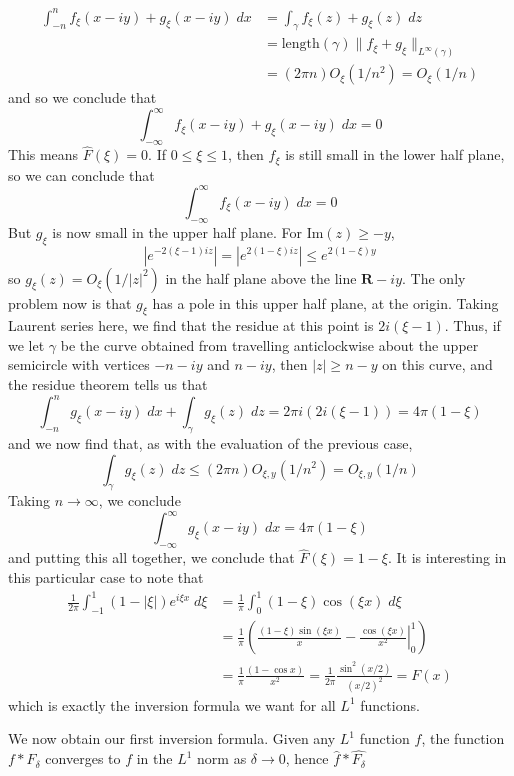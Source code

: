 \begin{example}
	\begin{align*}
		\int_{-n}^n f_\xi(x - iy) + g_\xi(x - iy)\; dx &= \int_\gamma f_\xi(z) + g_\xi(z)\; dz\\
		&= \text{length}(\gamma) \| f_\xi + g_\xi \|_{L^\infty(\gamma)}\\
		&= (2 \pi n) O_\xi(1/n^2) = O_\xi(1/n)
	\end{align*}
	and so we conclude that
	\[ \int_{-\infty}^\infty f_\xi(x - iy) + g_\xi(x - iy)\; dx = 0 \]
	This means $\widehat{F}(\xi) = 0$. If $0 \leq \xi \leq 1$, then $f_\xi$ is still small in the lower half plane, so we can conclude that
	\[ \int_{-\infty}^\infty f_\xi(x - iy)\; dx = 0 \]
	But $g_\xi$ is now small in the upper half plane. For $\text{Im}(z) \geq -y$,
	\[ |e^{-2(\xi - 1)iz}| = |e^{2(1 - \xi)iz}| \leq e^{2(1 - \xi)y} \] 
	so $g_\xi(z) = O_\xi(1/|z|^2)$ in the half plane above the line $\mathbf{R} - iy$. The only problem now is that $g_\xi$ has a pole in this upper half plane, at the origin. Taking Laurent series here, we find that the residue at this point is $2i(\xi - 1)$. Thus, if we let $\gamma$ be the curve obtained from travelling anticlockwise about the upper semicircle with vertices $-n - iy$ and $n - iy$, then $|z| \geq n - y$ on this curve, and the residue theorem tells us that
	\[ \int_{-n}^n g_\xi(x - iy)\; dx + \int_\gamma g_\xi(z)\; dz = 2\pi i (2i(\xi - 1)) = 4 \pi (1 - \xi) \]
	and we now find that, as with the evaluation of the previous case,
	\[ \int_\gamma g_\xi(z)\; dz \leq (2 \pi n) O_{\xi,y}(1/n^2) = O_{\xi,y}(1/n) \]
	Taking $n \to \infty$, we conclude
	\[ \int_{-\infty}^\infty g_\xi(x - iy)\; dx = 4 \pi (1 - \xi) \]
	and putting this all together, we conclude that $\widehat{F}(\xi) = 1 - \xi$. It is interesting in this particular case to note that
	\begin{align*}
		\frac{1}{2\pi} \int_{-1}^1 (1 - |\xi|) e^{i\xi x}\; d\xi &= \frac{1}{\pi} \int_0^1 (1 - \xi) \cos(\xi x)\; d\xi\\
		&= \frac{1}{\pi} \left( \left. \frac{(1 - \xi) \sin(\xi x)}{x} - \frac{\cos(\xi x)}{x^2} \right|_0^1 \right)\\
		&= \frac{1}{\pi} \frac{(1 - \cos x)}{x^2} = \frac{1}{2\pi} \frac{\sin^2(x/2)}{(x/2)^2} = F(x)
	\end{align*}
	which is exactly the inversion formula we want for all $L^1$ functions.
\end{example}

We now obtain our first inversion formula. Given any $L^1$ function $f$, the function $f * F_\delta$ converges to $f$ in the $L^1$ norm as $\delta \to 0$, hence $\widehat{f} * \widehat{F_\delta}$

